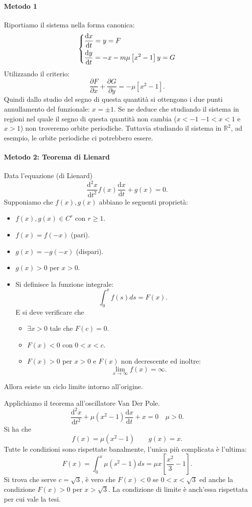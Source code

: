 \paragraph{Metodo 1}%
Riportiamo il sistema nella forma canonica:
\[
\begin{dcases}
\frac{\text{d} x}{\text{d} t} = y = F\\
\frac{\text{d} y}{\text{d} t} = -x - m\mu\left[x^2-1\right]y = G
\end{dcases}
\]
Utilizzando il criterio:
\[
    \frac{\partial F}{\partial x} + \frac{\partial G}{\partial y} = - \mu\left[x^2-1\right]
.\] 
Quindi dallo studio del segno di questa quantità si ottengono i due punti annullamento del funzionale: $x=\pm 1$. Se ne deduce che studiando il sistema in regioni nel quale il segno di questa quantità non cambia ($x<-1$  $-1< x < 1$ e $x > 1$) non troveremo orbite periodiche. Tuttavia studiando il sistema in $\mathbb{R}^2$, ad esempio, le orbite periodiche ci potrebbero essere.
\paragraph{Metodo 2: Teorema di Lienard}%
\begin{thm}
    Data l'equazione (di Lienard)
    \[
	\frac{\text{d} ^2x}{\text{d} t^2} f(x) \frac{\text{d} x}{\text{d} t} + g(x) = 0
    .\] 
    Supponiamo che $f(x), g(x)$ abbiano le seguenti proprietà:
    \begin{itemize}
	\item $f(x) , g(x) \in C^r$ con $r\ge 1$.
	\item $f(x) = f(-x)$ (pari).
	\item $g(x) = -g(-x)$ (dispari).
	\item $g(x) >0 $ per $x > 0$.
	\item Si definisce la funzione integrale:
	    \[
		\int_{0}^{x} f(s) ds = F(x)
	    .\] 
	    E si deve verificare che 
	    \begin{itemize}
		\item $\exists x > 0$ tale che $F(c) =0$.
		\item $F(x) < 0$ con $0<x<c$.
		\item $F(x) >0 $ per $x> 0$ e $F(x)$ non decrescente ed inoltre:
		    \[
			\lim_{x \to \infty} f(x) = \infty
		    .\] 
	    \end{itemize}
    \end{itemize}
    Allora esiste un ciclo limite intorno all'origine.
\end{thm}
\noindent
Applichiamo il teorema all'oscillatore Van Der Pole.
\[
    \frac{\text{d} ^2x}{\text{d} t^2} + \mu\left(x^2-1\right)\frac{\text{d} x}{\text{d} t} + x = 0 \quad  \mu  > 0
.\] 
Si ha che 
\[
    f(x) = \mu(x^2-1) \qquad  g(x) = x
.\] 
Tutte le condizioni sono rispettate banalmente, l'unica più complicata è l'ultima:
\[
    F(x) = \int_{0}^{x} \mu (s^2-1) ds = \mu x\left[\frac{x^2}{3}-1\right] 
.\] 
Si trova che serve $c = \sqrt{3} $, è vero che $F(x) < 0$  se $0<x<\sqrt{3}$  ed anche la condizione $F(x) >0$  per $x >\sqrt{3}$. La condizione di limite è anch'essa rispettata per cui vale la tesi.
